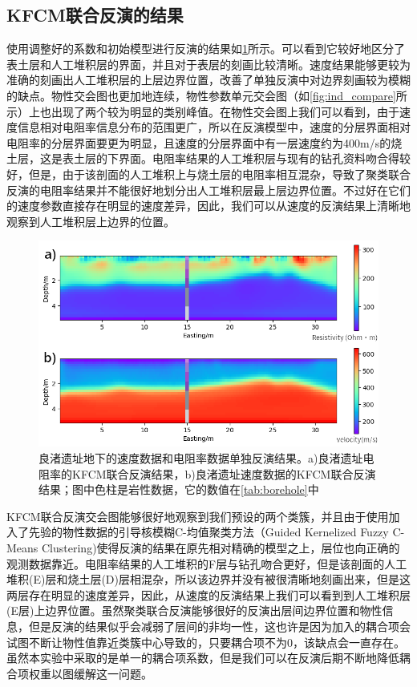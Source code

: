\subsection{KFCM联合反演的结果}

使用调整好的系数和初始模型进行反演的结果如\ref{fig:fcm_inv}所示。可以看到它较好地区分了表土层和人工堆积层的界面，并且对于表层的刻画比较清晰。速度结果能够更较为准确的刻画出人工堆积层的上层边界位置，改善了单独反演中对边界刻画较为模糊的缺点。物性交会图也更加地连续，物性参数单元交会图（如\ref{fig:ind_compare}所示）上也出现了两个较为明显的类别峰值。在物性交会图上我们可以看到，由于速度信息相对电阻率信息分布的范围更广，所以在反演模型中，速度的分层界面相对电阻率的分层界面要更为明显，且速度的分层界面中有一层速度约为400m/s的烧土层，这是表土层的下界面。电阻率结果的人工堆积层与现有的钻孔资料吻合得较好，但是，由于该剖面的人工堆积上与烧土层的电阻率相互混杂，导致了聚类联合反演的电阻率结果并不能很好地划分出人工堆积层最上层边界位置。不过好在它们的速度参数直接存在明显的速度差异，因此，我们可以从速度的反演结果上清晰地观察到人工堆积层上边界的位置。


\begin{figure}[ht]
    \centering
    \includegraphics[width=\textwidth]{figure/thesis/fcm_result.png}
    \caption{良渚遗址地下的速度数据和电阻率数据单独反演结果。a)良渚遗址电阻率的KFCM联合反演结果，b)良渚遗址速度数据的KFCM联合反演结果；图中色柱是岩性数据，它的数值在\ref{tab:borehole}中}
    \label{fig:fcm_inv}
\end{figure}

KFCM联合反演交会图能够很好地观察到我们预设的两个类簇，并且由于使用加入了先验的物性数据的引导核模糊C-均值聚类方法（Guided Kernelized Fuzzy C-Means Clustering)使得反演的结果在原先相对精确的模型之上，层位也向正确的观测数据靠近。电阻率结果的人工堆积的F层与钻孔吻合更好，但是该剖面的人工堆积(E)层和烧土层(D)层相混杂，所以该边界并没有被很清晰地刻画出来，但是这两层存在明显的速度差异，因此，从速度的反演结果上我们可以看到到人工堆积层(E层)上边界位置。虽然聚类联合反演能够很好的反演出层间边界位置和物性信息，但是反演的结果似乎会减弱了层间的非均一性，这也许是因为加入的耦合项会试图不断让物性值靠近类簇中心导致的，只要耦合项不为0，该缺点会一直存在。虽然本实验中采取的是单一的耦合项系数，但是我们可以在反演后期不断地降低耦合项权重以图缓解这一问题。

